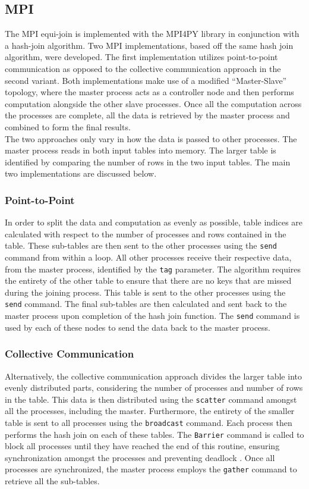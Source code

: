 \documentclass[10.5 pt, conference]{IEEEtran}
\begin{document}
\subsection{MPI}
The MPI equi-join is implemented with the MPI4PY library in conjunction with a hash-join algorithm. Two MPI implementations, based off the same hash join algorithm, were developed. The first implementation utilizes point-to-point communication as opposed to the collective communication approach in the second variant. Both implementations make use of a modified “Master-Slave” topology, where the master process acts as a controller node and then performs computation alongside the other slave processes. Once all the computation across the processes are complete, all the data is retrieved by the master process and combined to form the final results.\\

The two approaches only vary in how the data is passed to other processes. The master process reads in both input tables into memory. The larger table is identified by comparing the number of rows in the two input tables. The main two implementations are discussed below.

\subsubsection{Point-to-Point} 
In order to split the data and computation as evenly as possible, table indices are calculated with respect to the number of processes and rows contained in the table. These sub-tables are then sent to the other processes using the \verb|send| command from within a loop. All other processes receive their respective data, from the master process, identified by the \verb|tag| parameter. The algorithm requires the entirety of the other table to ensure that there are no keys that are missed during the joining process. This table is sent to the other processes using the \verb|send| command. The final sub-tables are then calculated and sent back to the master process upon completion of the hash join function. The \verb|send| command is used by each of these nodes to send the data back to the master process.

\subsubsection{Collective Communication}  
Alternatively, the collective communication approach divides the larger table into evenly distributed parts, considering the number of processes and number of rows in the table. This data is then distributed using the \verb|scatter| command amongst all the processes, including the master. Furthermore, the entirety of the smaller table is sent to all processes using the \verb|broadcast| command. Each process then performs the hash join on each of these tables. The \verb|Barrier| command is called to block all processes until they have reached the end of this routine, ensuring synchronization amongst the processes and preventing deadlock \cite{Dalcin2017}. Once all processes are synchronized, the master process employs the \verb|gather| command to retrieve all the sub-tables.\\
\end{document}
